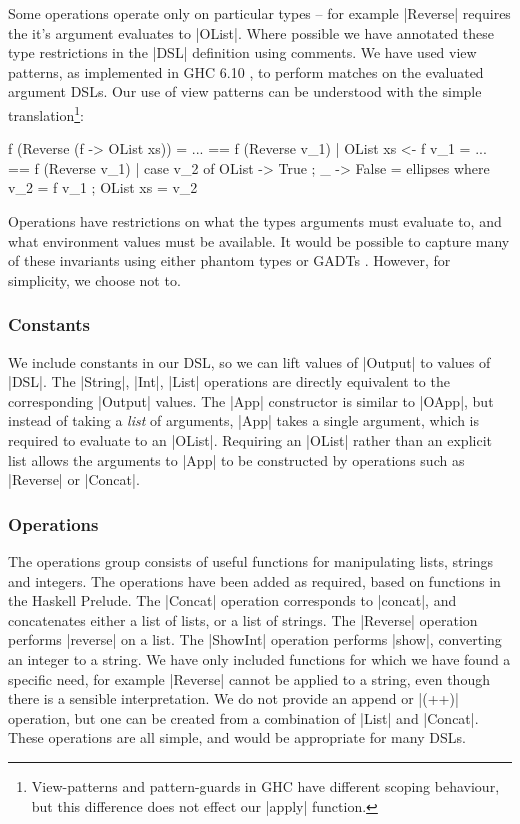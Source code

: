\documentclass[preprint,draft]{sigplanconf}
\begin{document}
Some operations operate only on particular types -- for example |Reverse| requires the it's argument evaluates to |OList|. Where possible we have annotated these type restrictions in the |DSL| definition using comments. We have used view patterns, as implemented in GHC 6.10 \cite{ghc6_10}, to perform matches on the evaluated argument DSLs. Our use of view patterns can be understood with the simple translation\footnote{View-patterns and pattern-guards in GHC have different scoping behaviour, but this difference does not effect our |apply| function.}:

\ignore\begin{code}
f (Reverse (f -> OList xs)) = ...
    ==
f (Reverse v_1) | OList xs <- f v_1 = ...
    ==
f (Reverse v_1) | case v_2 of OList{} -> True ; _ -> False = ellipses
    where  v_2 = f v_1 ; OList xs = v_2
\end{code}

Operations have restrictions on what the types arguments must evaluate to, and what environment values must be available. It would be possible to capture many of these invariants using either phantom types \cite{fluet:phantom} or GADTs \cite{spj:gadt}. However, for simplicity, we choose not to.

\subsubsection{Constants}

We include constants in our DSL, so we can lift values of |Output| to values of |DSL|. The |String|, |Int|, |List| operations are directly equivalent to the corresponding |Output| values. The |App| constructor is similar to |OApp|, but instead of taking a \textit{list} of arguments, |App| takes a single argument, which is required to evaluate to an |OList|. Requiring an |OList| rather than an explicit list allows the arguments to |App| to be constructed by operations such as |Reverse| or |Concat|.

\subsubsection{Operations}

The operations group consists of useful functions for manipulating lists, strings and integers. The operations have been added as required, based on functions in the Haskell Prelude. The |Concat| operation corresponds to |concat|, and concatenates either a list of lists, or a list of strings. The |Reverse| operation performs |reverse| on a list. The |ShowInt| operation performs |show|, converting an integer to a string. We have only included functions for which we have found a specific need, for example |Reverse| cannot be applied to a string, even though there is a sensible interpretation. We do not provide an append or |(++)| operation, but one can be created from a combination of |List| and |Concat|. These operations are all simple, and would be appropriate for many DSLs.
\end{document}
